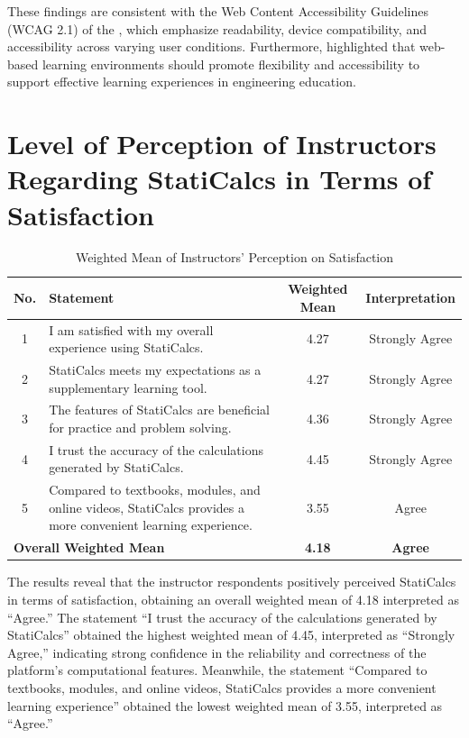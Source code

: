 These findings are consistent with the Web Content Accessibility Guidelines (WCAG 2.1) of the \cite{world_wide_web_consortium_w3c_web_nodate}, which emphasize readability, device compatibility, and accessibility across varying user conditions. Furthermore, \cite{abumandour_applying_2021} highlighted that web-based learning environments should promote flexibility and accessibility to support effective learning experiences in engineering education.


\section{Level of Perception of Instructors Regarding StatiCalcs in Terms of Satisfaction}


\begin{table}[H]
\centering
\caption{Weighted Mean of Instructors’ Perception on Satisfaction}
\renewcommand{\arraystretch}{1.3}
\begin{tabular}{cp{6.5cm}cc}
\hline
\textbf{No.} & \textbf{Statement} & \textbf{Weighted Mean} & \textbf{Interpretation}\\
\hline
1 & I am satisfied with my overall experience using StatiCalcs. & 4.27 & Strongly Agree\\
2 & StatiCalcs meets my expectations as a supplementary learning tool. & 4.27 & Strongly Agree\\
3 & The features of StatiCalcs are beneficial for practice and problem solving. & 4.36 & Strongly Agree\\
4 & I trust the accuracy of the calculations generated by StatiCalcs. & 4.45 & Strongly Agree\\
5 & Compared to textbooks, modules, and online videos, StatiCalcs provides a more convenient learning experience. & 3.55 & Agree\\
\multicolumn{2}{l}{\textbf{Overall Weighted Mean}} & \textbf{4.18} & \textbf{Agree}\\
\hline
\end{tabular}
\end{table}

The results reveal that the instructor respondents positively perceived StatiCalcs in terms of satisfaction, obtaining an overall weighted mean of 4.18 interpreted as ``Agree.'' The statement ``I trust the accuracy of the calculations generated by StatiCalcs'' obtained the highest weighted mean of 4.45, interpreted as ``Strongly Agree,'' indicating strong confidence in the reliability and correctness of the platform’s computational features. Meanwhile, the statement ``Compared to textbooks, modules, and online videos, StatiCalcs provides a more convenient learning experience'' obtained the lowest weighted mean of 3.55, interpreted as ``Agree.''

